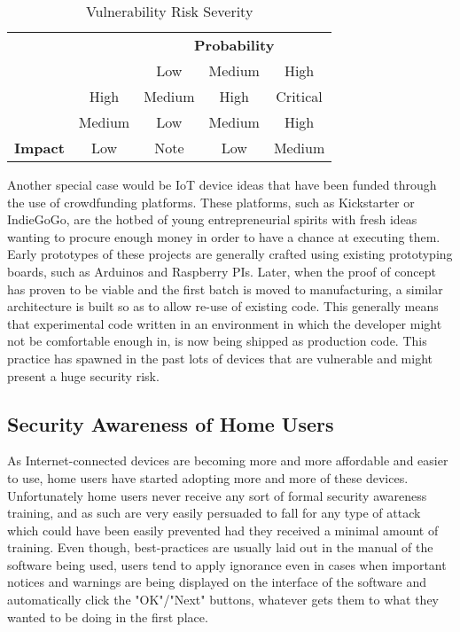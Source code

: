 \documentclass[a4paper,12pt]{article}
\begin{document}
	\begin{table}[!htbp]
		\centering
		\begin{tabular}{ccccc}
			\multicolumn{1}{l}{} & \multicolumn{1}{l}{} & \multicolumn{3}{c}{{\bf Probability}} \\
			\multicolumn{1}{l}{} &  & \cellcolor[HTML]{EFEFEF}Low & \cellcolor[HTML]{C0C0C0}Medium & \cellcolor[HTML]{9B9B9B}High \\
			& \cellcolor[HTML]{9B9B9B}High & \cellcolor[HTML]{F8A102}Medium & \cellcolor[HTML]{FE0000}High & \cellcolor[HTML]{FFCCC9}Critical \\
			& \cellcolor[HTML]{C0C0C0}Medium & \cellcolor[HTML]{FCFF2F}Low & \cellcolor[HTML]{F8A102}Medium & \cellcolor[HTML]{FE0000}High \\
			\multirow{-3}{*}{{\bf Impact}} & \cellcolor[HTML]{EFEFEF}Low & \cellcolor[HTML]{34FF34}Note & \cellcolor[HTML]{FCFF2F}Low & \cellcolor[HTML]{F8A102}Medium
		\end{tabular}
		\caption{Vulnerability Risk Severity}
		\label{vulnrisksever}
	\end{table}
	
	Another special case would be IoT device ideas that have been funded through the use of crowdfunding platforms. These platforms, such as Kickstarter or IndieGoGo, are the hotbed of young entrepreneurial spirits with fresh ideas wanting to procure enough money in order to have a chance at executing them. Early prototypes of these projects are generally crafted using existing prototyping boards, such as Arduinos and Raspberry PIs. Later, when the proof of concept has proven to be viable and the first batch is moved to manufacturing, a similar architecture is built so as to allow re-use of existing code. This generally means that experimental code written in an environment in which the developer might not be comfortable enough in, is now being shipped as production code. This practice has spawned in the past lots of devices that are vulnerable and might present a huge security risk.\cite{mstan14}
	
\subsection{Security Awareness of Home Users}
	
	As Internet-connected devices are becoming more and more affordable and easier to use, home users have started adopting more and more of these devices. Unfortunately home users never receive any sort of formal security awareness training, and as such are very easily persuaded to fall for any type of attack which could have been easily prevented had they received a minimal amount of training. Even though, best-practices are usually laid out in the manual of the software being used, users tend to apply ignorance\cite{jnielsen12} even in cases when important notices and warnings are being displayed on the interface of the software and automatically click the "OK"/"Next" buttons, whatever gets them to what they wanted to be doing in the first place.
	
\end{document}
